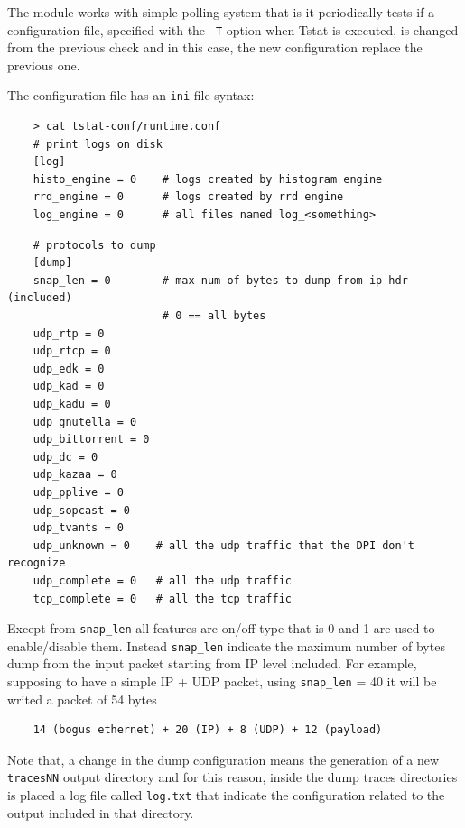 \documentclass[11pt]{article}
\begin{document}
The module works with simple polling system that is it periodically tests if a configuration file,
specified with the \texttt{-T} option when Tstat is executed, is changed from the previous check
and in this case, the new configuration replace the previous one.



The configuration file has an \texttt{ini} file syntax:

\begin{small}\begin{verbatim}
    > cat tstat-conf/runtime.conf
    # print logs on disk
    [log]
    histo_engine = 0    # logs created by histogram engine
    rrd_engine = 0      # logs created by rrd engine
    log_engine = 0      # all files named log_<something>
\end{verbatim}\end{small} \noindent
\begin{small}\begin{verbatim}
    # protocols to dump
    [dump]
    snap_len = 0        # max num of bytes to dump from ip hdr (included)
                        # 0 == all bytes
    udp_rtp = 0
    udp_rtcp = 0
    udp_edk = 0
    udp_kad = 0
    udp_kadu = 0
    udp_gnutella = 0
    udp_bittorrent = 0
    udp_dc = 0
    udp_kazaa = 0
    udp_pplive = 0
    udp_sopcast = 0
    udp_tvants = 0
    udp_unknown = 0    # all the udp traffic that the DPI don't recognize
    udp_complete = 0   # all the udp traffic
    tcp_complete = 0   # all the tcp traffic
\end{verbatim}\end{small} \noindent
Except from \texttt{snap\_len} all features are on/off type that is 0 and 1 are used to 
enable/disable them. Instead \texttt{snap\_len} indicate the maximum number of bytes
dump from the input packet starting from IP level included. For example, supposing
to have a simple IP + UDP packet, using \texttt{snap\_len} = 40 it will be writed a
packet of 54 bytes

\begin{small}\begin{verbatim}
    14 (bogus ethernet) + 20 (IP) + 8 (UDP) + 12 (payload)
\end{verbatim}\end{small} \noindent
Note that, a change
in the dump configuration means the generation of a new \texttt{tracesNN} output directory
and for this reason, inside the dump traces directories is placed a log file
called \texttt{log.txt} that indicate the configuration related to the output 
included in that directory.
\end{document}

